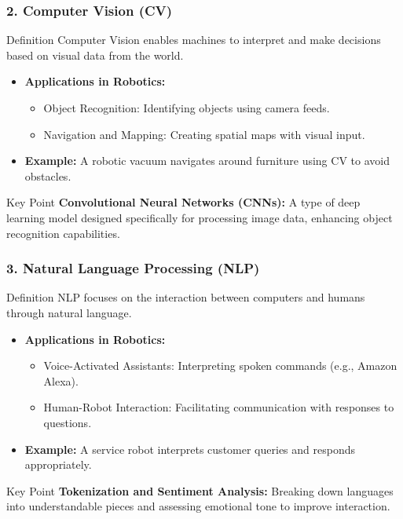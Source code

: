 \documentclass[aspectratio=169]{beamer}
\begin{document}
\begin{frame}[fragile]
    \frametitle{2. Computer Vision (CV)}
    \begin{block}{Definition}
        Computer Vision enables machines to interpret and make decisions based on visual data from the world.
    \end{block}

    \begin{itemize}
        \item \textbf{Applications in Robotics:}
        \begin{itemize}
            \item Object Recognition: Identifying objects using camera feeds.
            \item Navigation and Mapping: Creating spatial maps with visual input.
        \end{itemize}
        \item \textbf{Example:} A robotic vacuum navigates around furniture using CV to avoid obstacles.
    \end{itemize}

    \begin{block}{Key Point}
        \textbf{Convolutional Neural Networks (CNNs):} 
        A type of deep learning model designed specifically for processing image data, enhancing object recognition capabilities.
    \end{block}
\end{frame}

\begin{frame}[fragile]
    \frametitle{3. Natural Language Processing (NLP)}
    \begin{block}{Definition}
        NLP focuses on the interaction between computers and humans through natural language.
    \end{block}

    \begin{itemize}
        \item \textbf{Applications in Robotics:}
        \begin{itemize}
            \item Voice-Activated Assistants: Interpreting spoken commands (e.g., Amazon Alexa).
            \item Human-Robot Interaction: Facilitating communication with responses to questions.
        \end{itemize}
        \item \textbf{Example:} A service robot interprets customer queries and responds appropriately.
    \end{itemize}

    \begin{block}{Key Point}
        \textbf{Tokenization and Sentiment Analysis:}
        Breaking down languages into understandable pieces and assessing emotional tone to improve interaction.
    \end{block}
\end{frame}
\end{document}
